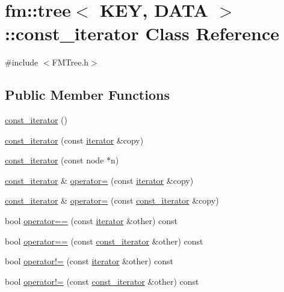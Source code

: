 \hypertarget{classfm_1_1tree_1_1const__iterator}{
\section{fm::tree$<$ KEY, DATA $>$::const\_\-iterator Class Reference}
\label{classfm_1_1tree_1_1const__iterator}
}


{\ttfamily \#include $<$FMTree.h$>$}

\subsection*{Public Member Functions}
\begin{DoxyCompactItemize}
\item 
\hyperlink{classfm_1_1tree_1_1const__iterator_aa330af47ca2bffdba07899258daf0795}{const\_\-iterator} ()
\item 
\hyperlink{classfm_1_1tree_1_1const__iterator_a39e90a1ec80e7f87f1876afc05a21817}{const\_\-iterator} (const \hyperlink{classfm_1_1tree_1_1iterator}{iterator} \&copy)
\item 
\hyperlink{classfm_1_1tree_1_1const__iterator_a3bfcb6528c87bd1bf1d85ef245b78bee}{const\_\-iterator} (const node $\ast$n)
\item 
\hyperlink{classfm_1_1tree_1_1const__iterator}{const\_\-iterator} \& \hyperlink{classfm_1_1tree_1_1const__iterator_ab53c0a7acec7c84eaf418ad05cb0fa63}{operator=} (const \hyperlink{classfm_1_1tree_1_1iterator}{iterator} \&copy)
\item 
\hyperlink{classfm_1_1tree_1_1const__iterator}{const\_\-iterator} \& \hyperlink{classfm_1_1tree_1_1const__iterator_ad965b6ad007ace833de30e6f5b75f671}{operator=} (const \hyperlink{classfm_1_1tree_1_1const__iterator}{const\_\-iterator} \&copy)
\item 
bool \hyperlink{classfm_1_1tree_1_1const__iterator_a46062effd7925af47181e924b23330fc}{operator==} (const \hyperlink{classfm_1_1tree_1_1iterator}{iterator} \&other) const 
\item 
bool \hyperlink{classfm_1_1tree_1_1const__iterator_abd27608fa704cd025477d313eb00294a}{operator==} (const \hyperlink{classfm_1_1tree_1_1const__iterator}{const\_\-iterator} \&other) const 
\item 
bool \hyperlink{classfm_1_1tree_1_1const__iterator_a86aff9854087ad1dc40afcbf00d5a7d7}{operator!=} (const \hyperlink{classfm_1_1tree_1_1iterator}{iterator} \&other) const 
\item 
bool \hyperlink{classfm_1_1tree_1_1const__iterator_a8241695495f324c6d56da516202a79c1}{operator!=} (const \hyperlink{classfm_1_1tree_1_1const__iterator}{const\_\-iterator} \&other) const 

\end{DoxyCompactItemize}

